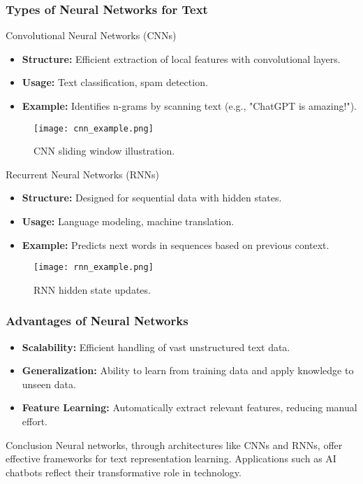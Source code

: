 \documentclass[aspectratio=169]{beamer}
\begin{document}
\begin{frame}[fragile]
    \frametitle{Types of Neural Networks for Text}
    \begin{block}{Convolutional Neural Networks (CNNs)}
        \begin{itemize}
            \item \textbf{Structure:} 
              Efficient extraction of local features with convolutional layers.
            \item \textbf{Usage:} 
              Text classification, spam detection.
            \item \textbf{Example:} 
              Identifies n-grams by scanning text (e.g., "ChatGPT is amazing!").
        \end{itemize}
        \begin{figure}
            \centering
            \texttt{[image: cnn\_example.png]}
            \caption{CNN sliding window illustration.}
        \end{figure}
    \end{block}

    \begin{block}{Recurrent Neural Networks (RNNs)}
        \begin{itemize}
            \item \textbf{Structure:} 
              Designed for sequential data with hidden states.
            \item \textbf{Usage:} 
              Language modeling, machine translation.
            \item \textbf{Example:} 
              Predicts next words in sequences based on previous context.
        \end{itemize}
        \begin{figure}
            \centering
            \texttt{[image: rnn\_example.png]}
            \caption{RNN hidden state updates.}
        \end{figure}
    \end{block}
\end{frame}

\begin{frame}[fragile]
    \frametitle{Advantages of Neural Networks}
    \begin{itemize}
        \item \textbf{Scalability:} 
            Efficient handling of vast unstructured text data.
        \item \textbf{Generalization:} 
            Ability to learn from training data and apply knowledge to unseen data.
        \item \textbf{Feature Learning:} 
            Automatically extract relevant features, reducing manual effort.
    \end{itemize}
    \begin{block}{Conclusion}
        Neural networks, through architectures like CNNs and RNNs, offer effective frameworks for text representation learning.
        Applications such as AI chatbots reflect their transformative role in technology.
    \end{block}
\end{frame}
\end{document}
